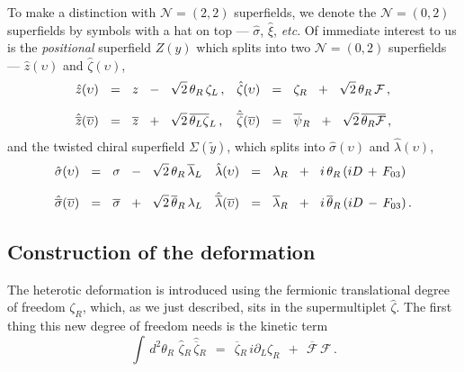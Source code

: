 \documentclass[epsfig,12pt]{article}
\def\beq{\begin{equation}}
\def\eeq{\end{equation}}
\newcommand{\ntwot}{${\mathcal N}= \left(2,2\right) $ }
\newcommand{\ntwoo}{${\mathcal N}= \left(0,2\right) $ }
\newcommand{\cfe}{{\mathcal F}}
\newcommand{\p}{\partial}
\newcommand{\wt}{\widetilde}
\newcommand{\ov}{\overline}
\newcommand{\hxi}{\hat\xi{}}
\newcommand{\hsigma}{\hat\sigma{}}
\newcommand{\hbsigma}{\hat{\ov\sigma}{}}
\newcommand{\hlambda}{\hat\lambda{}}
\newcommand{\hblambda}{\hat{\ov\lambda}{}}
\newcommand{\hz}{\hat z{}}
\newcommand{\hbz}{\hat{\ov z}{}}
\newcommand{\hzeta}{\hat\zeta{}}
\newcommand{\hbzeta}{\hat{\ov\zeta}{}}
\begin{document}
	To make a distinction with \ntwot superfields, we denote the \ntwoo superfields
	by symbols with a hat on top --- $ \hsigma $, $ \hxi $, {\it etc}.
	Of immediate interest to us is the {\it positional} superfield $ Z(y) $ which splits
	into two \ntwoo superfields --- $ \hz(\upsilon) $ and $ \hzeta(\upsilon) $,
\begin{align}
%
\notag
	\hz(\upsilon) &    ~~=~~    z  ~~-~~  \sqrt{2}\,\theta_R\,\zeta_L\,,
	&
	\hzeta(\upsilon) &    ~~=~~    \zeta_R  ~~+~~  \sqrt{2}\,\theta_R\,\cfe\,,
	\\[2mm]
%
	\hbz(\ov\upsilon) &    ~~=~~    \ov z  ~~+~~  \sqrt{2}\,\ov{\theta_L \zeta}{}_L\,,
	&
	\hbzeta(\ov\upsilon) &    ~~=~~    \ov\psi{}_R  ~~+~~  \sqrt{2}\,\ov{\theta_R \cfe}\,,
\end{align}
	and the twisted chiral superfield $ \Sigma(\wt y) $, which splits into 
	$ \hsigma(\upsilon) $ and $ \hlambda(\upsilon) $,
\begin{align}
%
\notag
	\hsigma(\upsilon) &    ~~=~~    \sigma  ~~-~~  \sqrt{2}\,\theta_R\,\ov\lambda{}_L
	&
	\hlambda(\upsilon) &    ~~=~~    \lambda_R  ~~+~~  i\,\theta_R\,(iD \,+\, F_{03})
	\\[2mm]
%
	\hbsigma(\ov\upsilon) &    ~~=~~    \ov\sigma  ~~+~~  \sqrt{2}\,\ov\theta{}_R\,\lambda_L
	&
	\hblambda(\ov\upsilon) &    ~~=~~    \ov\lambda{}_R  ~~+~~  i\,\ov\theta{}_R\,(iD \,-\, F_{03})\,.
\end{align}


\subsection{Construction of the deformation}

	The heterotic deformation is introduced using the fermionic translational degree
	of freedom $ \zeta_R $, which, as we just described, sits in the 
	supermultiplet $ \hzeta $.
	The first thing this new degree of freedom needs is the kinetic term
\beq
	\int\, d^2\theta_R\,\, \hzeta_R\, \hbzeta_R    ~~=~~    \ov\zeta{}_R\,i\p_L \zeta_R  ~~+~~  \ov\cfe\,\cfe\,.
\eeq
\end{document}
